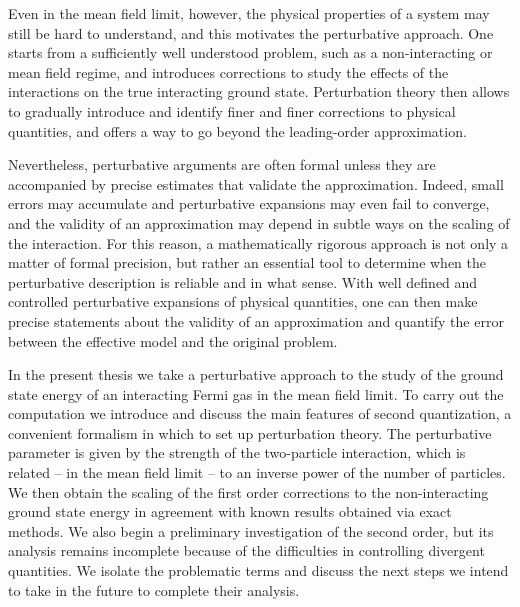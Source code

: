Even in the mean field limit, however, the physical properties of a system may still be
hard to understand, and this motivates the perturbative approach. One starts from a
sufficiently well understood problem, such as a non-interacting or mean field regime, and
introduces corrections to study the effects of the interactions on the true interacting
ground state. Perturbation theory then allows to gradually introduce and identify finer and
finer corrections to physical quantities, and offers a way to go beyond the leading-order
approximation.

Nevertheless, perturbative arguments are often formal unless they are accompanied by precise
estimates that validate the approximation. Indeed, small errors may accumulate and
perturbative expansions may even fail to converge, and the validity of an approximation may
depend in subtle ways on the scaling of the interaction. For this reason, a mathematically
rigorous approach is not only a matter of formal precision, but rather an essential tool
to determine when the perturbative description is reliable and in what sense. With well
defined and controlled perturbative expansions of physical quantities, one can then make
precise statements about the validity of an approximation and quantify the error between the
effective model and the original problem.

In the present thesis we take a perturbative approach to the study of the ground state
energy of an interacting Fermi gas in the mean field limit. To carry out the computation we
introduce and discuss the main features of second quantization, a convenient formalism in
which to set up perturbation theory. The perturbative parameter is given by the strength of
the two-particle interaction, which is related -- in the mean field limit -- to an inverse
power of the number of particles. We then obtain the scaling of the first order corrections
to the non-interacting ground state energy in agreement with known results obtained via
exact methods. We also begin a preliminary investigation of the second order, but its analysis
remains incomplete because of the difficulties in controlling divergent quantities. We isolate
the problematic terms and discuss the next steps we intend to take in the future to complete
their analysis.
